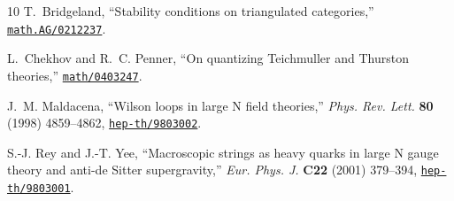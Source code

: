\begin{thebibliography}{10}
T.~Bridgeland, ``{S}tability conditions on triangulated categories,''
  \href{http://www.arXiv.org/abs/math.AG/0212237}{{\tt math.AG/0212237}}.

L.~Chekhov and R.~C. Penner, ``{O}n quantizing {T}eichmuller and {T}hurston
  theories,'' \href{http://www.arXiv.org/abs/math/0403247}{{\tt math/0403247}}.

J.~M. Maldacena, ``{Wilson loops in large N field theories},'' {\em Phys. Rev.
  Lett.} {\bf 80} (1998) 4859--4862,
\href{http://www.arXiv.org/abs/hep-th/9803002}{{\tt hep-th/9803002}}.

S.-J. Rey and J.-T. Yee, ``{Macroscopic strings as heavy quarks in large N
  gauge theory and anti-de Sitter supergravity},'' {\em Eur. Phys. J.} {\bf
  C22} (2001) 379--394,
\href{http://www.arXiv.org/abs/hep-th/9803001}{{\tt hep-th/9803001}}.

\end{thebibliography}
